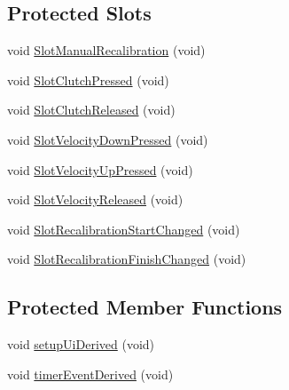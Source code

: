 \subsection*{Protected Slots}
\begin{DoxyCompactItemize}
\item 
void \hyperlink{classmts_intuitive_research_kit_s_u_j_qt_widget_afe449e4c26925130c7ec72ab60eb3543}{Slot\-Manual\-Recalibration} (void)
\item 
void \hyperlink{classmts_intuitive_research_kit_s_u_j_qt_widget_abf9d554738e374261a6773ca0ab56eae}{Slot\-Clutch\-Pressed} (void)
\item 
void \hyperlink{classmts_intuitive_research_kit_s_u_j_qt_widget_a89d1fcc4e150acf5c5632431eff8b813}{Slot\-Clutch\-Released} (void)
\item 
void \hyperlink{classmts_intuitive_research_kit_s_u_j_qt_widget_aa601b4f6461214ac4428c7120074d893}{Slot\-Velocity\-Down\-Pressed} (void)
\item 
void \hyperlink{classmts_intuitive_research_kit_s_u_j_qt_widget_a10743d52652443dc1d37e588081ac59d}{Slot\-Velocity\-Up\-Pressed} (void)
\item 
void \hyperlink{classmts_intuitive_research_kit_s_u_j_qt_widget_a84b40c3447b82e9d809dd7bbdf94d97c}{Slot\-Velocity\-Released} (void)
\item 
void \hyperlink{classmts_intuitive_research_kit_s_u_j_qt_widget_a664fd51d2341c9933ddecc83fed16008}{Slot\-Recalibration\-Start\-Changed} (void)
\item 
void \hyperlink{classmts_intuitive_research_kit_s_u_j_qt_widget_a2cae3a3599340a5f3f0ac964b106956a}{Slot\-Recalibration\-Finish\-Changed} (void)
\end{DoxyCompactItemize}
\subsection*{Protected Member Functions}
\begin{DoxyCompactItemize}
\item 
void \hyperlink{classmts_intuitive_research_kit_s_u_j_qt_widget_a374edb96b342b2b8983191ad02d0b461}{setup\-Ui\-Derived} (void)
\item 
void \hyperlink{classmts_intuitive_research_kit_s_u_j_qt_widget_afd9d20422d09d396aa35b00cfef6f054}{timer\-Event\-Derived} (void)
\end{DoxyCompactItemize}
